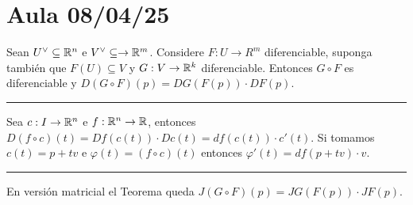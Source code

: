 \section*{Aula 08/04/25}

\begin{theorem}
    Sean \(U^\ab \subseteq \R^n\) e \(V^\ab \subseteq \to \R^m\). Considere \(F: U\to R^m\) diferenciable, suponga también que \(F(U)\subseteq V\) y \(G:V\to \mathbb{R}^k\) diferenciable. Entonces \(G \circ F\) es diferenciable y \(D(G\circ F)(p) = DG(F(p))\cdot DF(p)\). 
\end{theorem}

\E

\hrule 
\begin{example}
    Sea \(c:I\to\mathbb{R}^n\) e \(f:\mathbb{R}^n\to \mathbb{R}\), entonces \(D(f\circ c )(t) = Df(c(t))\cdot Dc(t) = df(c(t)) \cdot c'(t) \). Si tomamos \(c(t) = p + tv\) e \(\varphi (t) = (f\circ c) (t)\) entonces \(\varphi'(t) = df(p+tv)\cdot v\). 
\end{example}
\hrule 

\E

\begin{note}
    En versión matricial el Teorema queda \(J(G\circ F)(p) = JG(F(p))\cdot JF(p)\). 
\end{note}